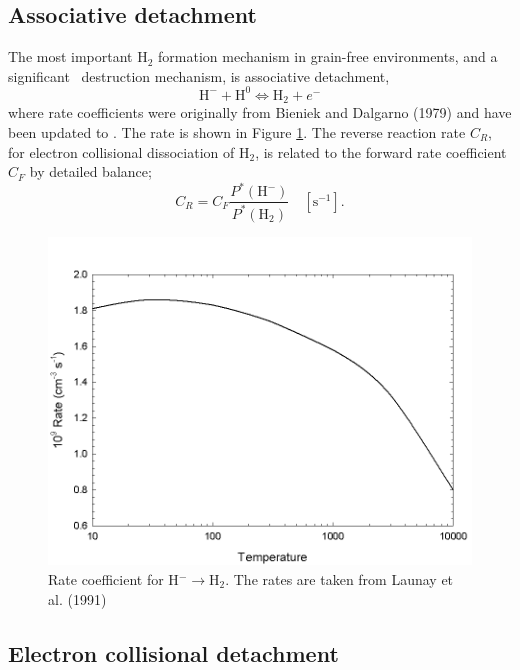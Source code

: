 \subsection{Associative detachment}

The most important H$_2$ formation mechanism in grain-free environments,
and a significant \hminus\ destruction mechanism, is associative detachment,
\begin{equation}
{{\mathrm{H}}^ - } + {{\mathrm{H}}^0} \Leftrightarrow {{\mathrm{H}}_2} + {e^ - }
\end{equation}
where rate coefficients were originally from Bieniek and Dalgarno (1979)
and have been updated to \citet{Launay1991}.  The rate is shown in Figure
\ref{fig:hminus_to_h2}.  The reverse reaction rate $C_R$, for electron collisional dissociation
of H$_2$, is related to the forward rate coefficient $C_F$ by detailed balance;
\begin{equation}
{C_R} = {C_F}\frac{{{P^*}({{\mathrm{H}}^ - })}}{{{P^*}({{\mathrm{H}}_2})}}
\quad  [\mathrm{s}^{-1}].
\end{equation}

\begin{figure}
\centering
\includegraphics[scale=0.8]{hminus_to_h2}
\caption{Rate coefficient for H$^- \to \mathrm{H}_2$.
The rates are taken from Launay et al. (1991)}
\label{fig:hminus_to_h2}
\end{figure}

\subsection{Electron collisional detachment}

